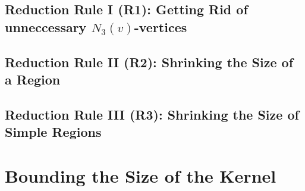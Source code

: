 \subsection{Reduction Rule I (R1): Getting Rid of unneccessary $N_3(v)$-vertices}

\begin{lemma}
    
\end{lemma}

\subsection{Reduction Rule II (R2): Shrinking the Size of a Region}
\begin{lemma}
    
\end{lemma}

\subsection{ Reduction Rule III (R3): Shrinking the Size of Simple Regions}
\begin{lemma}
    
\end{lemma}

\begin{lemma}
    
\end{lemma}


\begin{lemma} 
    
\end{lemma}

\section{Bounding the Size of the Kernel}


\begin{lemma}
    
\end{lemma}

\begin{lemma}
    
\end{lemma}

\begin{lemma}
    
\end{lemma}

